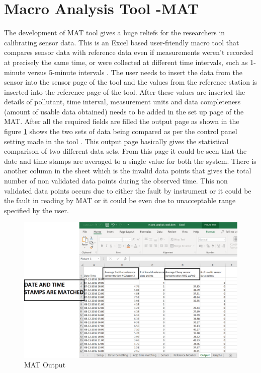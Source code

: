 \section{Macro Analysis Tool -MAT}
The development of MAT tool gives a huge reliefs for the researchers in calibrating sensor data. This is an Excel based user-friendly macro tool that compares sensor data with reference data \cite{National2017} even if measurements weren’t recorded at precisely the same time, or were collected at different time intervals, such as 1-minute versus 5-minute intervals \cite{mattool}. The user needs to insert the data from the sensor into the sensor page of the tool and the values from the reference station is inserted into the reference page of the tool. After these values are inserted the details of pollutant, time interval, measurement units and data completeness (amount of usable data obtained) needs to be added in the set up page of the MAT. After all the required fields are filled the output page as shown in the figure \ref{MAT} shows the two sets of data being compared as per the control panel setting made in the tool \cite{National2017}.
This output page basically gives the statistical comparison of two different data sets. From this page it could be seen that the date and time stamps are averaged to a single value for both the system. There is another column in the sheet which is the invalid data points that gives the total number of non validated data points during the observed time. This non validated data points occurs due to either the fault by instrument or it could be the fault in reading by MAT or it could be even due to unacceptable range specified by the user.

\begin{figure}[h]
    \begin{center}
    \includegraphics[scale=0.35]{./images/figure6.png}
    \end{center}
    \caption{MAT Output}
    \label{MAT}
  \end{figure}

